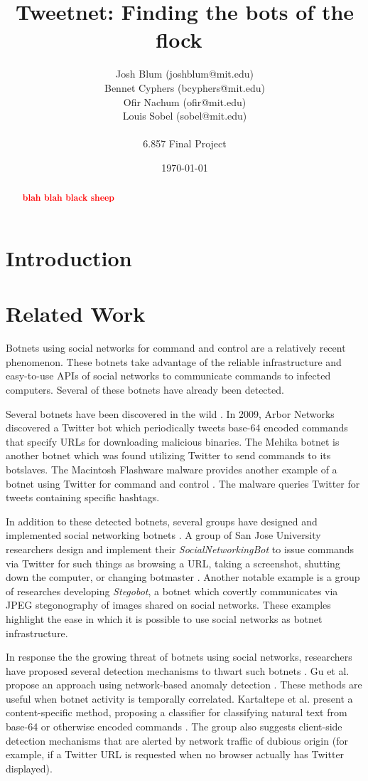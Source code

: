 \documentclass[11pt, oneside]{article} %
\title{ 
Tweetnet: Finding the bots of the flock\
}
\author{
Josh Blum (joshblum@mit.edu)\\
Bennet Cyphers (bcyphers@mit.edu)\\
Ofir Nachum (ofir@mit.edu)\\
Louis Sobel (sobel@mit.edu)\\
\\
6.857 Final Project
\date{\today}
}
\numberwithin{equation}{section} %
\numberwithin{figure}{section} %
\numberwithin{table}{section} %
\newcommand\todo[1]{\textbf{\textcolor{red}{#1}}}
\begin{document}
\maketitle

\vfill

\begin{abstract}
\todo{blah blah black sheep}
\end{abstract}

\clearpage

\section {Introduction}

\section {Related Work}
Botnets using social networks for command and control are a relatively recent phenomenon.  These botnets take advantage of the reliable infrastructure and easy-to-use APIs of social networks to communicate commands to infected computers.  Several of these botnets have already been detected.  

Several botnets have been discovered in the wild \cite{arbor, trendmicro, flashback}.  In 2009, Arbor Networks \cite{arbor} discovered a Twitter bot which periodically tweets base-64 encoded commands that specify URLs for downloading malicious binaries.  The Mehika botnet \cite{trendmicro} is another botnet which was found utilizing Twitter to send commands to its botslaves.  The Macintosh Flashware malware provides another example of a botnet using Twitter for command and control \cite{flashback}.  The malware queries Twitter for tweets containing specific hashtags.  

In addition to these detected botnets, several groups have designed and implemented social networking botnets \cite{socialnetworking, trojan7, stegobot}.  A group of San Jose University researchers design and implement their \emph{SocialNetworkingBot} to issue commands via Twitter for such things as browsing a URL, taking a screenshot, shutting down the computer, or changing botmaster \cite{socialnetworking}.  Another notable example is a group of researches developing \emph{Stegobot}, a botnet which covertly communicates via JPEG stegonography of images shared on social networks.  These examples highlight the ease in which it is possible to use social networks as botnet infrastructure.

In response the the growing threat of botnets using social networks, researchers have proposed several detection mechanisms to thwart such botnets \cite{botsniffer, kartaltepe, burghouwt}.  Gu et al. propose an approach using network-based anomaly detection \cite{botsniffer}.  These methods are useful when botnet activity is temporally correlated.  Kartaltepe et al. present a content-specific method, proposing a classifier for classifying natural text from base-64 or otherwise encoded commands \cite{kartaltepe}.  The group also suggests client-side detection mechanisms that are alerted by network traffic of dubious origin (for example, if a Twitter URL is requested when no browser actually has Twitter displayed).
\end{document}
